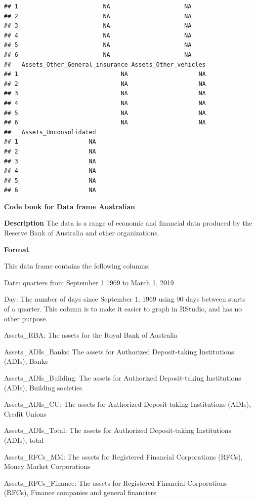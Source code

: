 \documentclass[
]{book}
\begin{document}
\begin{verbatim}
## 1                        NA                     NA
## 2                        NA                     NA
## 3                        NA                     NA
## 4                        NA                     NA
## 5                        NA                     NA
## 6                        NA                     NA
##   Assets_Other_General_insurance Assets_Other_vehicles
## 1                             NA                    NA
## 2                             NA                    NA
## 3                             NA                    NA
## 4                             NA                    NA
## 5                             NA                    NA
## 6                             NA                    NA
##   Assets_Unconsolidated
## 1                    NA
## 2                    NA
## 3                    NA
## 4                    NA
## 5                    NA
## 6                    NA
\end{verbatim}

\textbf{Code book for Data frame Australian}

\textbf{Description}
The data is a range of economic and financial data produced by the Reserve Bank of Australia and other organizations.

\textbf{Format}

This data frame contains the following columns:

Date: quarters from September 1 1969 to March 1, 2019

Day: The number of days since September 1, 1969 using 90 days between starts of a quarter. This column is to make it easier to graph in RStudio, and has no other purpose.

Assets\_RBA: The assets for the Royal Bank of Australia

Assets\_ADIs\_Banks: The assets for Authorized Deposit-taking Institutions (ADIs), Banks

Assets\_ADIs\_Building: The assets for Authorized Deposit-taking Institutions (ADIs), Building societies

Assets\_ADIs\_CU: The assets for Authorized Deposit-taking Institutions (ADIs), Credit Unions

Assets\_ADIs\_Total: The assets for Authorized Deposit-taking Institutions (ADIs), total

Assets\_RFCs\_MM: The assets for Registered Financial Corporations (RFCs), Money Market Corporations

Assets\_RFCs\_Finance: The assets for Registered Financial Corporations (RFCs), Finance companies and general financiers
\end{document}
